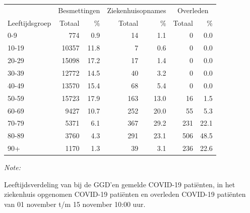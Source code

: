 \documentclass[
  english,
  man,floatsintext]{apa6}
\begin{document}
\begin{table}[H]
\centering\begingroup\fontsize{11}{13}\selectfont

\begin{threeparttable}
\begin{tabular}{lrrrrrr}
\toprule
\multicolumn{1}{c}{ } & \multicolumn{2}{c}{Besmettingen} & \multicolumn{2}{c}{Ziekenhuisopnames} & \multicolumn{2}{c}{Overleden} \\
\cmidrule(l{3pt}r{3pt}){2-3} \cmidrule(l{3pt}r{3pt}){4-5} \cmidrule(l{3pt}r{3pt}){6-7}
Leeftijdsgroep & Totaal & \% & Totaal & \% & Totaal & \%\\
\midrule
0-9 & 774 & 0.9 & 14 & 1.1 & 0 & 0.0\\
10-19 & 10357 & 11.8 & 7 & 0.6 & 0 & 0.0\\
20-29 & 15098 & 17.2 & 17 & 1.4 & 0 & 0.0\\
30-39 & 12772 & 14.5 & 40 & 3.2 & 0 & 0.0\\
40-49 & 13570 & 15.4 & 68 & 5.4 & 0 & 0.0\\
50-59 & 15723 & 17.9 & 163 & 13.0 & 16 & 1.5\\
60-69 & 9427 & 10.7 & 252 & 20.0 & 55 & 5.3\\
70-79 & 5371 & 6.1 & 367 & 29.2 & 231 & 22.1\\
80-89 & 3760 & 4.3 & 291 & 23.1 & 506 & 48.5\\
90+ & 1170 & 1.3 & 39 & 3.1 & 236 & 22.6\\
\bottomrule
\end{tabular}
\begin{tablenotes}
\item \textit{Note: } 
\item Leeftijdsverdeling van bij de GGD’en gemelde COVID-19 patiënten, in het ziekenhuis opgenomen COVID-19 patiënten en overleden COVID-19 patiënten van 01 november t/m 15 november 10:00 uur.
\end{tablenotes}
\end{threeparttable}
\endgroup{}
\end{table}
\end{document}
